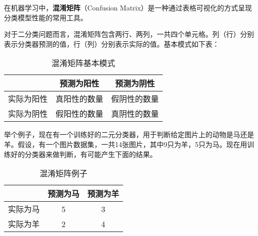 

在机器学习中，\textbf{混淆矩阵}（Confusion Matrix）是一种通过表格可视化的方式呈现分类模型性能的常用工具。

对于二分类问题而言，混淆矩阵包含两行、两列，一共四个单元格。列（行）分别表示分类器预测的值，行（列）分别表示实际的值。基本模式如下表：
\begin{table}[ht]
\centering
\caption{混淆矩阵基本模式}\label{tab_ConMat_1}
\begin{tabular}{|c|c|c|}
\hline
 & 预测为阳性 & 预测为阴性 \\
\hline
实际为阳性 & 真阳性的数量 & 假阴性的数量 \\
\hline
实际为阴性 & 假阳性的数量 & 真阴性的数量 \\
\hline
\end{tabular}
\end{table}
举个例子，现在有一个训练好的二元分类器，用于判断给定图片上的动物是马还是羊。假设，有一个图片数据集，一共14张图片，其中9只为羊，5只为马。现在用训练好的分类器来做判断，有可能产生下面的结果。
\begin{table}[ht]
\centering
\caption{混淆矩阵例子}\label{tab_ConMat_2}
\begin{tabular}{|c|c|c|}
\hline
 & 预测为马 & 预测为羊 \\
\hline
实际为马 & 5 & 3 \\
\hline
实际为羊 & 2 & 4 \\
\hline
\end{tabular}
\end{table}
